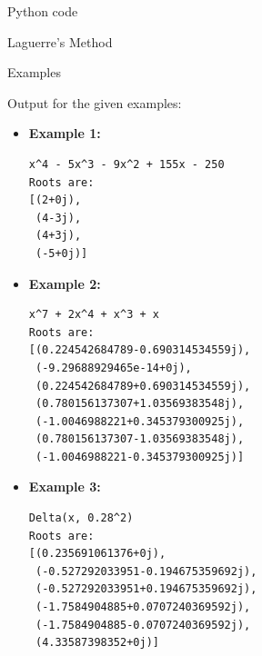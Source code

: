 \documentclass[11pt, a4paper, english, twoside, notitlepage, openright]{report}
\begin{document}
\begin{chapter}{Python code}\label{BB}
\begin{section}{Laguerre's Method}\label{lagSec}
\end{section}

\begin{section}{Examples}\label{exLagSec}

\begin{center}	\end{center}

\vspace{0.4cm}
Output for the given examples:

\begin{itemize}
\item \textbf{Example 1: }
\begin{lstlisting}[frame=tbrl]
x^4 - 5x^3 - 9x^2 + 155x - 250
Roots are:
[(2+0j),
 (4-3j),
 (4+3j),
 (-5+0j)] 
\end{lstlisting}
\item \textbf{Example 2:}
\begin{lstlisting}[frame=tbrl]
x^7 + 2x^4 + x^3 + x
Roots are:
[(0.224542684789-0.690314534559j),
 (-9.29688929465e-14+0j),
 (0.224542684789+0.690314534559j),
 (0.780156137307+1.03569383548j),
 (-1.0046988221+0.345379300925j),
 (0.780156137307-1.03569383548j),
 (-1.0046988221-0.345379300925j)] 
\end{lstlisting}
\item	 \textbf{Example 3:}
\begin{lstlisting}[frame=tbrl]
Delta(x, 0.28^2)
Roots are:
[(0.235691061376+0j),
 (-0.527292033951-0.194675359692j),
 (-0.527292033951+0.194675359692j),
 (-1.7584904885+0.0707240369592j),
 (-1.7584904885-0.0707240369592j),
 (4.33587398352+0j)] 
\end{lstlisting}
\end{itemize}

\end{section}

\end{chapter}
\end{document}
